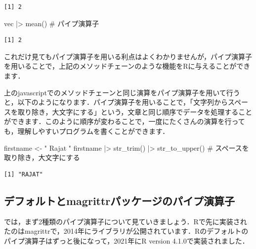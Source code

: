 \documentclass[
  letterpaper,
  DIV=11,
  numbers=noendperiod]{scrreprt}
\newenvironment{Shaded}{\begin{snugshade}}{\end{snugshade}}
\newcommand{\CommentTok}[1]{\textcolor[rgb]{0.37,0.37,0.37}{#1}}
\newcommand{\FunctionTok}[1]{\textcolor[rgb]{0.28,0.35,0.67}{#1}}
\newcommand{\NormalTok}[1]{\textcolor[rgb]{0.00,0.23,0.31}{#1}}
\newcommand{\OtherTok}[1]{\textcolor[rgb]{0.00,0.23,0.31}{#1}}
\newcommand{\SpecialCharTok}[1]{\textcolor[rgb]{0.37,0.37,0.37}{#1}}
\newcommand{\StringTok}[1]{\textcolor[rgb]{0.13,0.47,0.30}{#1}}
\begin{document}
\begin{verbatim}
[1] 2
\end{verbatim}

\begin{Shaded}
\begin{Highlighting}[]
\NormalTok{vec }\SpecialCharTok{|\textgreater{}} \FunctionTok{mean}\NormalTok{() }\CommentTok{\# パイプ演算子}
\end{Highlighting}
\end{Shaded}

\begin{verbatim}
[1] 2
\end{verbatim}

これだけ見てもパイプ演算子を用いる利点はよくわかりませんが，パイプ演算子を用いることで，上記のメソッドチェーンのような機能をRに与えることができます．

上のjavascriptでのメソッドチェーンと同じ演算をパイプ演算子を用いて行うと，以下のようになります．パイプ演算子を用いることで，「文字列からスペースを取り除き，大文字にする」という，文章と同じ順序でデータを処理することができます．このように順序が変わることで，一度にたくさんの演算を行っても，理解しやすいプログラムを書くことができます．

\begin{Shaded}
\begin{Highlighting}[]
\NormalTok{firstname }\OtherTok{\textless{}{-}} \StringTok{" Rajat "}
\NormalTok{firstname }\SpecialCharTok{|\textgreater{}} \FunctionTok{str\_trim}\NormalTok{() }\SpecialCharTok{|\textgreater{}} \FunctionTok{str\_to\_upper}\NormalTok{() }\CommentTok{\# スペースを取り除き，大文字にする}
\end{Highlighting}
\end{Shaded}

\begin{verbatim}
[1] "RAJAT"
\end{verbatim}

\hypertarget{ux30c7ux30d5ux30a9ux30ebux30c8ux3068magrittrux30d1ux30c3ux30b1ux30fcux30b8ux306eux30d1ux30a4ux30d7ux6f14ux7b97ux5b50}{%
\subsection{デフォルトとmagrittrパッケージのパイプ演算子}\label{ux30c7ux30d5ux30a9ux30ebux30c8ux3068magrittrux30d1ux30c3ux30b1ux30fcux30b8ux306eux30d1ux30a4ux30d7ux6f14ux7b97ux5b50}}

では，まず2種類のパイプ演算子について見ていきましょう．Rで先に実装されたのはmagrittrで，2014年にライブラリが公開されています．Rのデフォルトのパイプ演算子はずっと後になって，2021年にR
version 4.1.0で実装されました．
\end{document}
